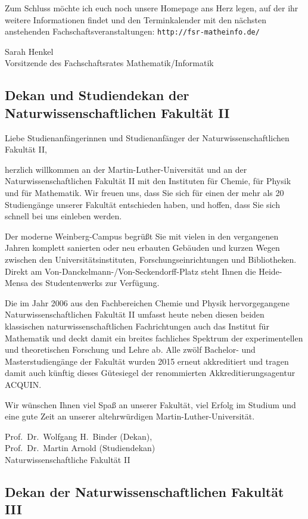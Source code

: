 Zum Schluss möchte ich euch noch unsere Homepage ans Herz legen, auf der ihr weitere Informationen findet und den Terminkalender mit den nächsten anstehenden Fachschaftsveranstaltungen: \texttt{http://fsr-matheinfo.de/}

Sarah Henkel\\
Vorsitzende des Fachschaftsrates Mathematik/Informatik


\subsection{Dekan und Studiendekan der Naturwissenschaftlichen Fakultät II}

Liebe Studienanfängerinnen und Studienanfänger der Naturwissenschaftlichen
Fakultät II,

herzlich willkommen an der Martin-Luther-Universität und an der
Naturwissenschaftlichen Fakultät II mit den Instituten für Chemie, für Physik
und für Mathematik. Wir freuen uns, dass Sie sich für einen der mehr als 20
Studiengänge unserer Fakultät entschieden haben, und hoffen, dass Sie sich
schnell bei uns einleben werden.

Der moderne Weinberg-Campus begrüßt Sie mit vielen in den vergangenen Jahren
komplett sanierten oder neu erbauten Gebäuden und kurzen Wegen zwischen den
Universitätsinstituten, Forschungseinrichtungen und Bibliotheken. Direkt am
Von-Danckelmann-/Von-Seckendorff-Platz steht Ihnen die Heide-Mensa des
Studentenwerks zur Verfügung.

Die im Jahr 2006 aus den Fachbereichen Chemie und Physik hervorgegangene
Naturwissenschaftlichen Fakultät II umfasst heute neben diesen beiden
klassischen naturwissenschaftlichen Fachrichtungen auch das Institut für
Mathematik und deckt damit ein breites fachliches Spektrum der experimentellen
und theoretischen Forschung und Lehre ab. Alle zwölf Bachelor- und
Masterstudiengänge der Fakultät wurden 2015 erneut
akkreditiert und tragen damit auch künftig dieses Gütesiegel der renommierten
Akkreditierungsagentur ACQUIN.

Wir wünschen Ihnen viel Spaß an unserer Fakultät, viel Erfolg im Studium und
eine gute Zeit an unserer altehrwürdigen Martin-Luther-Universität.

Prof.\ Dr.\ Wolfgang H.\ Binder (Dekan),\\
Prof.\ Dr.\ Martin Arnold (Studiendekan)\\
Naturwissenschaftliche Fakultät II 

\newpage

\subsection{Dekan der Naturwissenschaftlichen Fakultät III}

